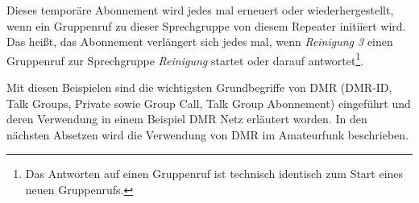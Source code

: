 Dieses temporäre Abonnement wird jedes mal erneuert oder wiederhergestellt, wenn ein Gruppenruf zu dieser Sprechgruppe von diesem Repeater initiiert wird. Das heißt, das Abonnement verlängert sich jedes mal, wenn \emph{Reinigung 3} einen Gruppenruf zur Sprechgruppe \emph{Reinigung} startet oder darauf antwortet\footnote{Das Antworten auf einen Gruppenruf ist technisch identisch zum Start eines neuen Gruppenrufs.}.

Mit diesen Beispielen sind die wichtigsten Grundbegriffe von DMR (DMR-ID, Talk Groups, Private sowie Group Call, Talk Group Abonnement) eingeführt und deren Verwendung in einem Beispiel DMR Netz erläutert worden. In den nächsten Absetzen wird die Verwendung von DMR im Amateurfunk beschrieben.


